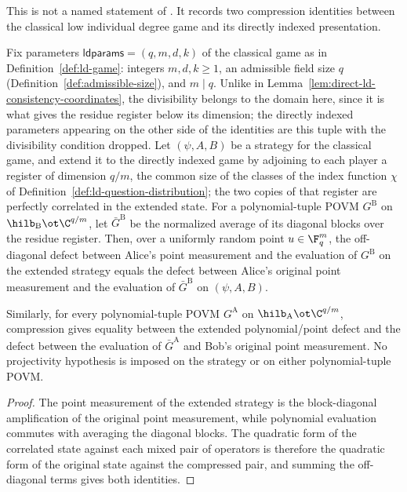 \begin{lemma}
	\label{lem:direct-ld-residue-compression}
	\leanok
	This is not a named statement of \cite{Ji2020MIPStar}. It records two
	compression identities between the classical low individual degree game
	and its directly indexed presentation.

	Fix parameters $\mathsf{ldparams}=(q,m,d,k)$ of the classical game as in
	Definition~\ref{def:ld-game}: integers $m,d,k \ge 1$, an admissible field
	size $q$ (Definition~\ref{def:admissible-size}), and $m \mid q$. Unlike
	in Lemma~\ref{lem:direct-ld-consistency-coordinates}, the divisibility
	belongs to the domain here, since it is what gives the residue register
	below its dimension; the directly indexed parameters appearing on the
	other side of the identities are this tuple with the divisibility
	condition dropped. Let $(\psi, A, B)$ be a strategy for the classical
	game, and extend it to the directly indexed game by adjoining to each
	player a register of dimension $q/m$, the common size of the classes of
	the index function $\chi$ of
	Definition~\ref{def:ld-question-distribution}; the two copies of that
	register are perfectly correlated in the extended state. For a
	polynomial-tuple POVM $G^{\mathrm B}$ on
	$\hilb_{\mathrm B}\ot\C^{q/m}$, let $\bar G^{\mathrm B}$ be the
	normalized average of its diagonal blocks over the residue register.
	Then, over a uniformly random point $u\in\F_q^m$, the off-diagonal
	defect between Alice's point measurement and the evaluation of
	$G^{\mathrm B}$ on the extended strategy equals the defect between
	Alice's original point measurement and the evaluation of
	$\bar G^{\mathrm B}$ on $(\psi,A,B)$.

	Similarly, for every polynomial-tuple POVM $G^{\mathrm A}$ on
	$\hilb_{\mathrm A}\ot\C^{q/m}$, compression gives equality between
	the extended polynomial/point defect and the defect between the
	evaluation of $\bar G^{\mathrm A}$ and Bob's original point
	measurement. No projectivity hypothesis is imposed on the strategy or
	on either polynomial-tuple POVM.
\end{lemma}
\begin{proof}
	\leanok
	The point measurement of the extended strategy is the block-diagonal
	amplification of the original point measurement, while polynomial
	evaluation commutes with averaging the diagonal blocks. The quadratic
	form of the correlated state against each mixed pair of operators is
	therefore the quadratic form of the original state against the
	compressed pair, and summing the off-diagonal terms gives both identities.
\end{proof}


